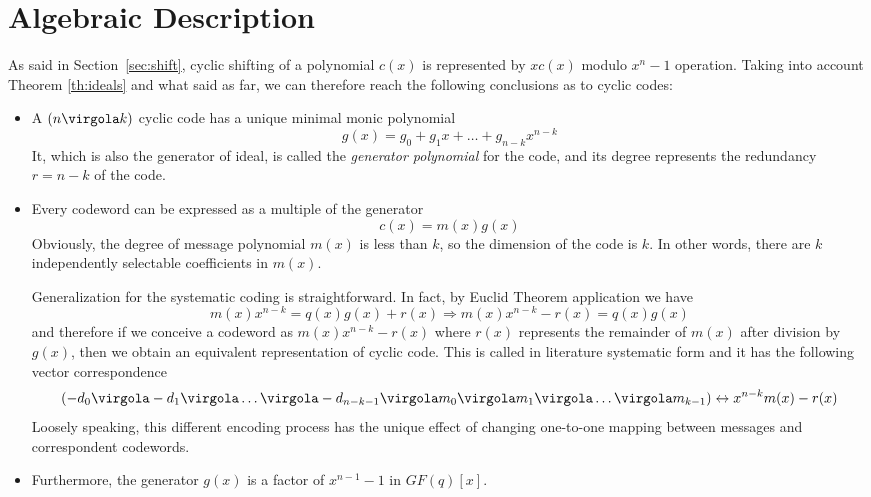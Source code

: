 \section{Algebraic Description}

As said in Section~\ref{sec:shift}, cyclic shifting of a polynomial \(c(x)\) is represented by \(xc(x)\) modulo \(x^n-1\) operation. Taking into account Theorem \ref{th:ideals} and what said as far, we can therefore reach the following conclusions as to cyclic codes:
\begin{itemize}
\item A $(n \virgola k)$ cyclic code has a unique minimal monic polynomial
\begin{equation}
    g(x) = g_0+g_1x+\ldots+g_{n-k}x^{n-k}
\end{equation}
It, which is also the generator of ideal, is called the \emph{generator polynomial} for the code, and its degree represents the redundancy $r=n-k$ of the code.

\item Every codeword can be expressed as a multiple of the generator
\begin{equation}
c(x)=m(x)g(x)
\end{equation}
Obviously, the degree of message polynomial $m(x)$ is less than $k$, so the dimension of the code is $k$. In other words, there are $k$ independently selectable coefficients in $m(x)$.

Generalization for the systematic coding is straightforward. In fact, by Euclid Theorem application we have
\begin{equation}
m(x)x^{n-k}= q(x)g(x)+r(x) \Rightarrow m(x)x^{n-k}-r(x) = q(x)g(x)
\end{equation}
and therefore if we conceive a codeword as $m(x)x^{n-k}-r(x)$ where $r(x)$ represents the remainder of $m(x)$ after division by $g(x)$, then we obtain an equivalent representation of cyclic code. This is called in literature systematic form and it has the following vector correspondence
\begin{equation}
(-d_0\virgola -d_1\virgola \ldots \virgola -d_{n-k-1}\virgola m_0 \virgola m_1 \virgola \ldots \virgola m_{k-1}) \leftrightarrow x^{n-k}m(x)-r(x)
\end{equation}
Loosely speaking, this different encoding process has the unique effect of changing one-to-one mapping between messages and correspondent codewords.
\item Furthermore, the generator $g(x)$ is a factor of $x^{n-1}-1$ in $GF(q)[x]$.
\end{itemize}




